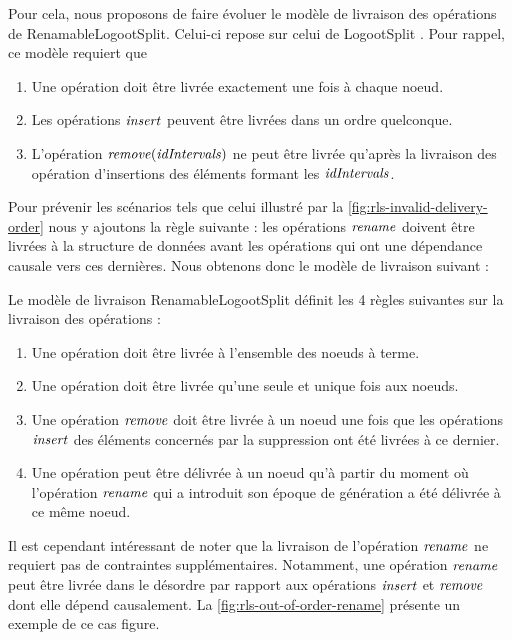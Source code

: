 Pour cela, nous proposons de faire évoluer le modèle de livraison des opérations de RenamableLogootSplit.
Celui-ci repose sur celui de LogootSplit .
Pour rappel, ce modèle requiert que
\begin{enumerate}
  \item Une opération doit être livrée exactement une fois à chaque noeud.
  \item Les opérations $\mathit{insert}$ peuvent être livrées dans un ordre quelconque.
  \item L'opération $\mathit{remove}(\mathit{idIntervals})$ ne peut être livrée qu'après la livraison des opération d'insertions des éléments formant les $\mathit{idIntervals}$.
\end{enumerate}

Pour prévenir les scénarios tels que celui illustré par la \autoref{fig:rls-invalid-delivery-order} nous y ajoutons la règle suivante : les opérations $\mathit{rename}$ doivent être livrées à la structure de données avant les opérations qui ont une dépendance causale vers ces dernières.
Nous obtenons donc le modèle de livraison suivant :

\begin{definition}
  \label{def:rls-delivery-model}
  Le modèle de livraison RenamableLogootSplit définit les 4 règles suivantes sur la livraison des opérations :
  \begin{enumerate}
    \item Une opération doit être livrée à l'ensemble des noeuds à terme.
    \item Une opération doit être livrée qu'une seule et unique fois aux noeuds.
    \item Une opération $\mathit{remove}$ doit être livrée à un noeud une fois que les opérations $\mathit{insert}$ des éléments concernés par la suppression ont été livrées à ce dernier.
    \item Une opération peut être délivrée à un noeud qu'à partir du moment où l'opération $\mathit{rename}$ qui a introduit son époque de génération a été délivrée à ce même noeud.
  \end{enumerate}
\end{definition}

Il est cependant intéressant de noter que la livraison de l'opération $\mathit{rename}$ ne requiert pas de contraintes supplémentaires.
Notamment, une opération $\mathit{rename}$ peut être livrée dans le désordre par rapport aux opérations $\mathit{insert}$ et $\mathit{remove}$ dont elle dépend causalement.
La \autoref{fig:rls-out-of-order-rename} présente un exemple de ce cas figure.

